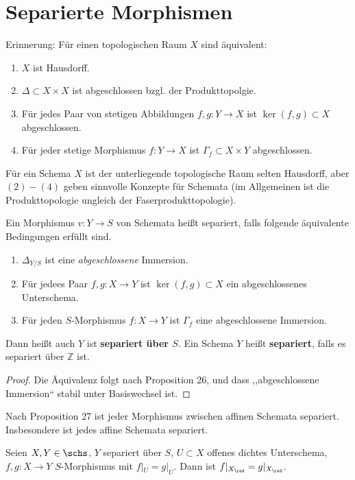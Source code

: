 \section{Separierte Morphismen}

Erinnerung: Für einen topologischen Raum $X$ sind äquivalent:
\begin{enumerate}
\item $X$ ist Hausdorff.
\item $\Delta\subset X\times X$ ist abgeschlossen bzgl. der Produkttopolgie.
\item Für jedes Paar von stetigen Abbildungen $f,g:Y\rightarrow X$ ist
  $\ker(f,g)\subset X$ abgeschlossen.
\item Für jeder stetige Morphismus $f:Y\rightarrow X$ ist $\Gamma_{f}\subset X\times Y$
  abgeschlossen.
\end{enumerate}
Für ein Schema $X$ ist der unterliegende topologische Raum selten
Hausdorff, aber $(2)-(4)$ geben sinnvolle Konzepte für Schemata (im
Allgemeinen ist die Produkttopologie ungleich der Faserprodukttopologie).
\begin{defn}[30]
  Ein Morphismus $v:Y\rightarrow S$ von Schemata heißt separiert,
  falls folgende äquivalente Bedingungen erfüllt sind.
  \begin{enumerate}
  \item $\Delta_{Y/S}$ ist eine \emph{abgeschlossene} Immersion.
  \item Für jedees Paar $f,g:X\rightarrow Y$ ist $\ker(f,g)\subset X$ ein
    abgeschlossenes Unterschema.
  \item Für jeden $S$-Morphismus $f:X\rightarrow Y$ ist $\Gamma_{f}$ eine
    abgeschlossene Immersion.
  \end{enumerate}
  Dann heißt auch $Y$ ist \textbf{separiert über $S$}. Ein Schema
  $Y$ heißt \textbf{separiert}, falls es separiert über $\mathbb{Z}$
  ist.
\end{defn}

\begin{proof}
  Die Äquivalenz folgt nach Proposition 26, und dass ,,abgeschlossene
  Immersion`` stabil unter Basiswechsel ist.
\end{proof}
Nach Proposition 27 ist jeder Morphismus zwischen affinen Schemata
separiert. Insbesondere ist jedes affine Schemata separiert.
\begin{prop}[31]
  Seien $X,Y\in\schs$, $Y$ separiert über $S$, $U\subset X$ offenes
  dichtes Unterschema, $f,g:X\rightarrow Y$ $S$-Morphismus mit $f|_{U}=g|_{U}$.
  Dann ist $f|_{X_{\red}}=g|_{X_{\red}}$.
\end{prop}

